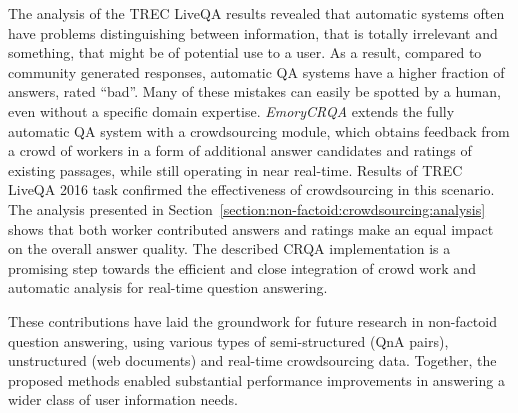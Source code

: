 The analysis of the TREC LiveQA results revealed that automatic systems often have problems distinguishing between information, that is totally irrelevant and something, that might be of potential use to a user.
As a result, compared to community generated responses, automatic QA systems have a higher fraction of answers, rated ``bad''.
Many of these mistakes can easily be spotted by a human, even without a specific domain expertise.
\textit{EmoryCRQA} extends the fully automatic QA system with a crowdsourcing module, which obtains feedback from a crowd of workers in a form of additional answer candidates and ratings of existing passages, while still operating in near real-time.
Results of TREC LiveQA 2016 task confirmed the effectiveness of crowdsourcing in this scenario.
The analysis presented in Section~\ref{section:non-factoid:crowdsourcing:analysis} shows that both worker contributed answers and ratings make an equal impact on the overall answer quality.
The described CRQA implementation is a promising step towards the efficient and close integration of crowd work and automatic analysis for real-time question answering.

These contributions have laid the groundwork for future research in non-factoid question answering, using various types of semi-structured (QnA pairs), unstructured (web documents) and real-time crowdsourcing data.
Together, the proposed methods enabled substantial performance improvements in answering a wider class of user information needs.